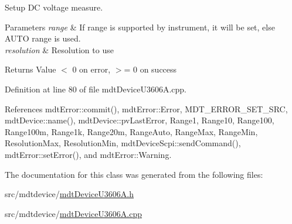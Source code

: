 Setup D\-C voltage measure. 


\begin{DoxyParams}{Parameters}
{\em range} & If range is supported by instrument, it will be set, else A\-U\-T\-O range is used. \\
\hline
{\em resolution} & Resolution to use \\
\hline
\end{DoxyParams}
\begin{DoxyReturn}{Returns}
Value $<$ 0 on error, $>$= 0 on success 
\end{DoxyReturn}


Definition at line 80 of file mdt\-Device\-U3606\-A.\-cpp.



References mdt\-Error\-::commit(), mdt\-Error\-::\-Error, M\-D\-T\-\_\-\-E\-R\-R\-O\-R\-\_\-\-S\-E\-T\-\_\-\-S\-R\-C, mdt\-Device\-::name(), mdt\-Device\-::pv\-Last\-Error, Range1, Range10, Range100, Range100m, Range1k, Range20m, Range\-Auto, Range\-Max, Range\-Min, Resolution\-Max, Resolution\-Min, mdt\-Device\-Scpi\-::send\-Command(), mdt\-Error\-::set\-Error(), and mdt\-Error\-::\-Warning.



The documentation for this class was generated from the following files\-:\begin{DoxyCompactItemize}
\item 
src/mdtdevice/\hyperlink{mdt_device_u3606_a_8h}{mdt\-Device\-U3606\-A.\-h}\item 
src/mdtdevice/\hyperlink{mdt_device_u3606_a_8cpp}{mdt\-Device\-U3606\-A.\-cpp}\end{DoxyCompactItemize}
